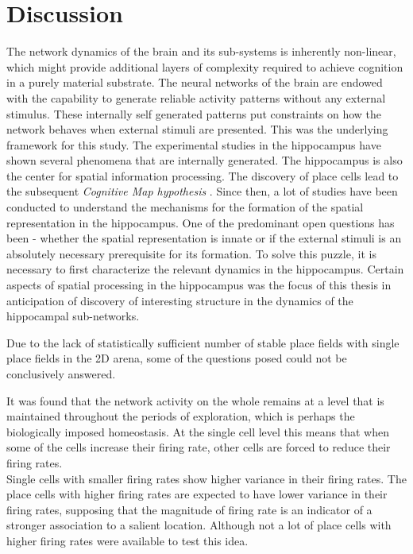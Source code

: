 \chapter{Discussion}

The network dynamics of the brain and its sub-systems is inherently non-linear, which might provide additional layers of complexity required to achieve cognition in a purely material substrate. The neural networks of the brain are endowed with the capability to generate reliable activity patterns without any external stimulus. These internally self generated patterns put constraints on how the network behaves when external stimuli are presented. This was the underlying framework for this study. The experimental studies in the hippocampus have shown several phenomena that are internally generated. The hippocampus is also the center for spatial information processing. The discovery of place cells \cite{O'Keefe1971a} lead to the subsequent \emph{Cognitive Map hypothesis} \cite{Street}. Since then, a lot of studies have been conducted to understand the mechanisms for the formation of the spatial representation in the hippocampus. One of the predominant open questions has been - whether the spatial representation is innate or if the external stimuli is an absolutely necessary prerequisite for its formation. To solve this puzzle, it is necessary to first characterize the relevant dynamics in the hippocampus. Certain aspects of spatial processing in the hippocampus was the focus of this thesis in anticipation of discovery of interesting structure in the dynamics of the hippocampal sub-networks. 

Due to the lack of statistically sufficient number of stable place fields with single place fields in the 2D arena, some of the questions posed could not be conclusively answered. 

It was found that the network activity on the whole remains at a level that is maintained throughout the periods of exploration, which is perhaps the biologically imposed homeostasis. At the single cell level this means that when some of the cells increase their firing rate, other cells are forced to reduce their firing rates. \\
Single cells with smaller firing rates show higher variance in their firing rates. The place cells with higher firing rates are expected to have lower variance in their firing rates, supposing that the magnitude of firing rate is an indicator of a stronger association to a salient location. Although not a lot of place cells with higher firing rates were available to test this idea.\\


